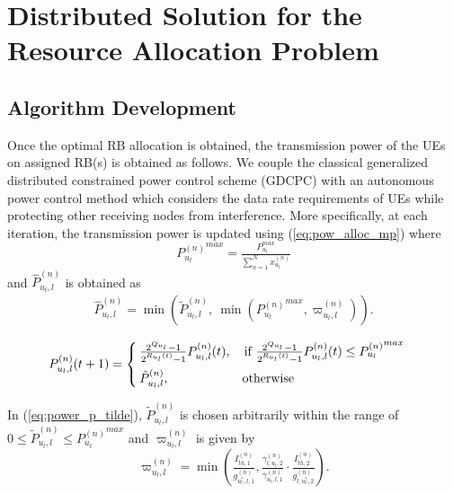 \documentclass[twocolumn,10pt]{IEEEtran}
\begin{document}
\section{Distributed Solution for the Resource Allocation Problem} \label{sec:distributed_sol}

\subsection{Algorithm Development}

Once the optimal RB allocation is obtained, the transmission power of the UEs on assigned RB(s) is obtained as follows. We couple the classical generalized distributed constrained power control scheme (GDCPC) \cite{power_gdpc} with an autonomous power control method \cite{auto_pow_cr} which considers the data rate requirements of UEs while protecting other receiving nodes from interference. More specifically, at each iteration, the transmission power is updated using  (\ref{eq:pow_alloc_mp}) where $${P_{u_l}^{(n)}}^{max} = \tfrac{ P_{u_l}^{max} } { \displaystyle \sum_{n=1}^{N} x_{u_l}^{(n)} }$$ and $ \hat{P}_{u_l,l}^{(n)}$ is obtained as 
\begin{align} \label{eq:power_p_tilde}
 \hat{P}_{u_l,l}^{(n)} = \min \left( \tilde{P}_{u_l,l}^{(n)}, ~ \min \left( {P_{u_l}^{(n)}}^{max}, \varpi_{u_l,l}^{(n)} \right) \right).
\end{align}

\begin{figure*}[!t]
\normalsize

\begin{align} \label{eq:pow_alloc_mp}
P_{u_l,l}^{(n)}(t+1) =   \begin{cases}
 \tfrac{2^{Q_{u_l}  } -1 }{2^{R_{u_l}(t) } - 1} P_{u_l,l}^{(n)}(t), \quad  \text{if $\tfrac{2^{Q_{u_l}  } -1 }{2^{R_{u_l}(t) } - 1} P_{u_l,l}^{(n)}(t) \leq {P_{u_l}^{(n)}}^{max}$} \vspace{0.5em}\\ 
 \hat{P}_{u_l,l}^{(n)}, \hspace{5.8em} \text{otherwise} 
\end{cases}
\end{align}

\hrulefill
\vspace*{4pt}
\end{figure*}


In (\ref{eq:power_p_tilde}), $\tilde{P}_{u_l,l}^{(n)}$ is chosen arbitrarily within the range of $0 \leq \tilde{P}_{u_l,l}^{(n)} \leq {P_{u_l}^{(n)}}^{max}$ and $\varpi_{u_l,l}^{(n)} $ is given by
\begin{equation}
\varpi_{u_l,l}^{(n)} =  \min \left( \tfrac{  I_{th, 1}^{(n)} } { g_{{u_l^*}, l, 1}^{(n)}  },  \tfrac{\gamma_{l, u_l, 2}^{(n)}}{\gamma_{u_l, l, 1}^{(n)}} \cdot \tfrac{ I_{th, 2}^{(n)} }{ g_{l, {u_l^*}, 2}^{(n)} }    \right).
\end{equation}
\end{document}

